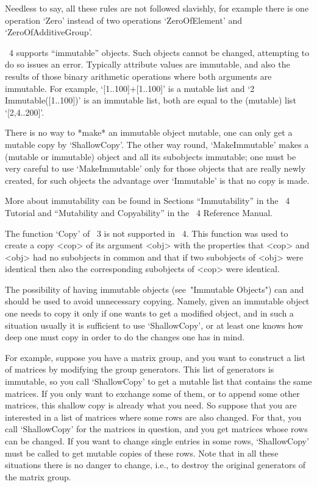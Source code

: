 Needless to say, all these rules are not followed slavishly,
for example there is one operation `Zero' instead of two operations
`ZeroOfElement' and `ZeroOfAdditiveGroup'.



{\GAP}~4 supports ``immutable'' objects.  Such objects cannot be
changed, attempting to do so issues an error.  Typically attribute
values are immutable, and also the results of those binary arithmetic
operations where both arguments are immutable.
For example, `[1..100]+[1..100]' is a
mutable list and `2 \* Immutable([1..100])' is an immutable
list, both are equal to the (mutable) list `[2,4..200]'.

There is no way to *make* an immutable object mutable, one can only
get a mutable copy by `ShallowCopy'.  The other way round,
`MakeImmutable' makes a (mutable or immutable) object and all its
subobjects immutable; one must be very careful to use `MakeImmutable'
only for those objects that are really newly created, for such objects
the advantage over `Immutable' is that no copy is made.

More about immutability can be found in Sections ``Immutability'' in
the {\GAP}~4 Tutorial and ``Mutability and Copyability'' in the {\GAP}~4
Reference Manual.



The function `Copy' of {\GAP}~3 is not supported in {\GAP}~4.  This
function was used to create a copy <cop> of its argument <obj> with
the properties that <cop> and <obj> had no subobjects in common and
that if two subobjects of <obj> were identical then also the
corresponding subobjects of <cop> were identical.

The possibility of having immutable objects (see~"Immutable Objects") can and
should be used to avoid unnecessary copying.
Namely, given an immutable object one needs to copy it only if one wants
to get a modified object, and in such a situation usually it is
sufficient to use `ShallowCopy', or at least one knows how deep one must
copy in order to do the changes one has in mind.

For example, suppose you have a matrix group, and you want to
construct a list of matrices by modifying the group generators.  This
list of generators is immutable, so you call `ShallowCopy' to get a
mutable list that contains the same matrices.  If you only want to
exchange some of them, or to append some other matrices, this shallow
copy is already what you need.  So suppose that you are interested in
a list of matrices where some rows are also changed.  For that, you
call `ShallowCopy' for the matrices in question, and you get matrices
whose rows can be changed.  If you want to change single entries in
some rows, `ShallowCopy' must be called to get mutable copies of these
rows.  Note that in all these situations there is no danger to change,
i.e., to destroy the original generators of the matrix group.

